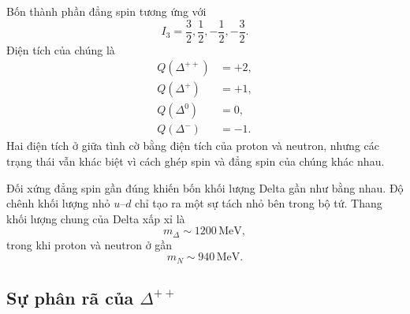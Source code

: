 \begin{classroomqa}
\end{classroomqa}

\begin{classroomqa}
\end{classroomqa}

Bốn thành phần đẳng spin tương ứng với
\begin{equation}
I_3=\frac32,\frac12,-\frac12,-\frac32.
\end{equation}
Điện tích của chúng là
\begin{align}
Q(\Delta^{++})&=+2,\\
Q(\Delta^{+})&=+1,\\
Q(\Delta^{0})&=0,\\
Q(\Delta^{-})&=-1.
\end{align}
Hai điện tích ở giữa tình cờ bằng điện tích của proton và neutron, nhưng các trạng thái vẫn khác biệt vì cách ghép spin và đẳng spin của chúng khác nhau.

Đối xứng đẳng spin gần đúng khiến bốn khối lượng Delta gần như bằng nhau. Độ chênh khối lượng nhỏ \(u\)--\(d\) chỉ tạo ra một sự tách nhỏ bên trong bộ tứ. Thang khối lượng chung của Delta xấp xỉ là
\begin{equation}
m_\Delta\sim1200\,\mathrm{MeV},
\end{equation}
trong khi proton và neutron ở gần
\begin{equation}
m_N\sim940\,\mathrm{MeV}.
\end{equation}

\subsection{Sự phân rã của \texorpdfstring{\(\Delta^{++}\)}{Delta++}}

